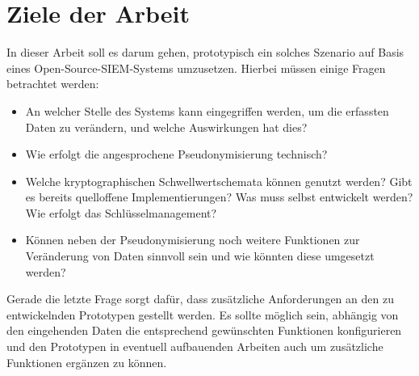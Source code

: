 \section*{Ziele der Arbeit}






In dieser Arbeit soll es darum gehen, prototypisch ein solches Szenario auf Basis eines Open-Source-SIEM-Systems umzusetzen. 
Hierbei müssen einige Fragen betrachtet werden:

\begin{itemize}
\item An welcher Stelle des Systems kann eingegriffen werden, um die erfassten Daten zu verändern, und welche Auswirkungen hat dies?
\item Wie erfolgt die angesprochene Pseudonymisierung technisch?
\item Welche kryptographischen Schwellwertschemata können genutzt werden? Gibt es bereits quelloffene Implementierungen? Was muss selbst entwickelt werden? Wie erfolgt das Schlüsselmanagement?
\item Können neben der Pseudonymisierung noch weitere Funktionen zur Veränderung von Daten sinnvoll sein und wie könnten diese umgesetzt werden?
\end{itemize}

Gerade die letzte Frage sorgt dafür, dass zusätzliche Anforderungen an den zu entwickelnden Prototypen gestellt werden. Es sollte möglich sein, abhängig von den eingehenden Daten die entsprechend gewünschten Funktionen konfigurieren und den Prototypen in eventuell aufbauenden Arbeiten auch um zusätzliche Funktionen ergänzen zu können.
